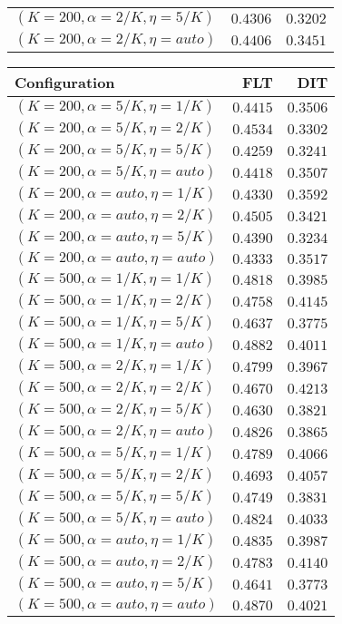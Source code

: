 \begin{table}
\begin{spacing}{1.2}
{\begin{tabular}{lrr}
   $(K=200,\alpha=2/K,\eta=5/K)$ & $0.4306$ & $0.3202$ \\
  $(K=200,\alpha=2/K,\eta=auto)$ & $0.4406$ & $0.3451$ \\
\bottomrule
\end{tabular}
} \hfill \parbox{.45\linewidth}{\centering \begin{tabular}{lrr}
\toprule
                   Configuration &           FLT &           DIT \\
\midrule
   $(K=200,\alpha=5/K,\eta=1/K)$ &      $0.4415$ &      $0.3506$ \\
   $(K=200,\alpha=5/K,\eta=2/K)$ &      $0.4534$ &      $0.3302$ \\
   $(K=200,\alpha=5/K,\eta=5/K)$ &      $0.4259$ &      $0.3241$ \\
  $(K=200,\alpha=5/K,\eta=auto)$ &      $0.4418$ &      $0.3507$ \\
  $(K=200,\alpha=auto,\eta=1/K)$ &      $0.4330$ &      $0.3592$ \\
  $(K=200,\alpha=auto,\eta=2/K)$ &      $0.4505$ &      $0.3421$ \\
  $(K=200,\alpha=auto,\eta=5/K)$ &      $0.4390$ &      $0.3234$ \\
 $(K=200,\alpha=auto,\eta=auto)$ &      $0.4333$ &      $0.3517$ \\
   $(K=500,\alpha=1/K,\eta=1/K)$ &      $0.4818$ &      $0.3985$ \\
   $(K=500,\alpha=1/K,\eta=2/K)$ &      $0.4758$ &      $0.4145$ \\
   $(K=500,\alpha=1/K,\eta=5/K)$ &      $0.4637$ &      $0.3775$ \\
  $(K=500,\alpha=1/K,\eta=auto)$ & $\bm{0.4882}$ &      $0.4011$ \\
   $(K=500,\alpha=2/K,\eta=1/K)$ &      $0.4799$ &      $0.3967$ \\
   $(K=500,\alpha=2/K,\eta=2/K)$ &      $0.4670$ & $\bm{0.4213}$ \\
   $(K=500,\alpha=2/K,\eta=5/K)$ &      $0.4630$ &      $0.3821$ \\
  $(K=500,\alpha=2/K,\eta=auto)$ &      $0.4826$ &      $0.3865$ \\
   $(K=500,\alpha=5/K,\eta=1/K)$ &      $0.4789$ &      $0.4066$ \\
   $(K=500,\alpha=5/K,\eta=2/K)$ &      $0.4693$ &      $0.4057$ \\
   $(K=500,\alpha=5/K,\eta=5/K)$ &      $0.4749$ &      $0.3831$ \\
  $(K=500,\alpha=5/K,\eta=auto)$ &      $0.4824$ &      $0.4033$ \\
  $(K=500,\alpha=auto,\eta=1/K)$ &      $0.4835$ &      $0.3987$ \\
  $(K=500,\alpha=auto,\eta=2/K)$ &      $0.4783$ &      $0.4140$ \\
  $(K=500,\alpha=auto,\eta=5/K)$ &      $0.4641$ &      $0.3773$ \\
 $(K=500,\alpha=auto,\eta=auto)$ &      $0.4870$ &      $0.4021$ \\
\bottomrule
\end{tabular}
}
\end{spacing}
\end{table}
